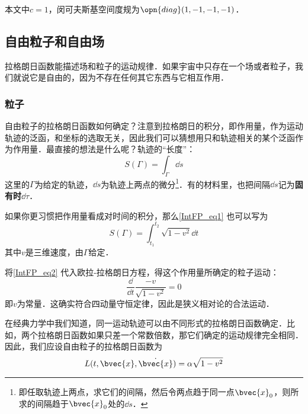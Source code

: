 

本文中$c=1$，闵可夫斯基空间度规为$\opn{diag}(1, -1, -1, -1)$．

\subsection{自由粒子和自由场}

拉格朗日函数能描述场和粒子的运动规律．如果宇宙中只存在一个场或者粒子，我们就说它是自由的，因为不存在任何其它东西与它相互作用．

\subsubsection{粒子}

自由粒子的拉格朗日函数如何确定？注意到拉格朗日的积分，即作用量，作为运动轨迹的泛函，和坐标的选取无关，因此我们可以猜想用只和轨迹相关的某个泛函作为作用量．最直接的想法是什么呢？轨迹的“长度”：
\begin{equation}\label{IntFP_eq1}
S(\Gamma) = \int_\Gamma \dd s
\end{equation}
这里的$\Gamma$为给定的轨迹，$\dd s$为轨迹上两点的微分\footnote{即任取轨迹上两点，求它们的间隔，然后令两点趋于同一点$\bvec{x}_0$，则所求的间隔趋于$\bvec{x}_0$处的$\dd s$．}．有的材料里，也把间隔$\dd s$记为\textbf{固有时}$\dd \tau$．

如果你更习惯把作用量看成对时间的积分，那么\autoref{IntFP_eq1} 也可以写为
\begin{equation}\label{IntFP_eq2}
S(\Gamma) = \int_{t_1}^{t_2} \sqrt{1-v^2} \dd t
\end{equation}
其中$v$是三维速度，由$\Gamma$给定．

将\autoref{IntFP_eq2} 代入欧拉-拉格朗日方程，得这个作用量所确定的粒子运动：
\begin{equation}
\frac{\dd}{\dd t}\frac{-v}{\sqrt{1-v^2}} = 0
\end{equation}
即$v$为常量．这确实符合四动量守恒定律，因此是狭义相对论的合法运动．

在经典力学中我们知道，同一运动轨迹可以由不同形式的拉格朗日函数确定．比如，两个拉格朗日函数如果只差一个常数倍数，那它们确定的运动规律完全相同．因此，我们应设自由粒子的拉格朗日函数为
\begin{equation}
L(t, \bvec{x}, \dot{\bvec{x}}) = \alpha\sqrt{1-v^2}
\end{equation}

